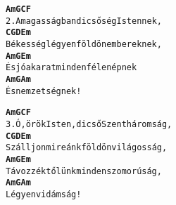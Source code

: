 \begin{minipage}{\textwidth}
\kottastart
{}
\kottaend
\begin{minipage}{\textwidth}
\begin{multicols}{2}
\begin{minipage}{\textwidth}
\begin{alltt}
\textbf{   Am             G          C  F}
2. A magasságban dicsőség Istennek,
\textbf{    C        G      D             Em}
   Békesség légyen földön embereknek,
\textbf{   Am     G     Em}
   És jóakarat mindenféle népnek
\textbf{   Am        G  Am}
   És nemzetségnek!
\end{alltt}
\vspace{0.0cm}
\versszakspacing
\end{minipage}
\begin{minipage}{\textwidth}
\begin{alltt}
\textbf{   Am             G             C  F}
3. Ó, örök Isten, dicső Szentháromság,
\textbf{     C         G     D          Em}
   Szálljon mireánk földön világosság,
\textbf{   Am        G      Em}
   Távozzék tőlünk minden szomorúság,
\textbf{    Am       G  Am}
   Légyen vidámság!
\end{alltt}
\vspace{0.0cm}
\versszakspacing
\end{minipage}
\vspace{0.2cm}
\end{multicols}
\end{minipage}

\end{minipage}
~\vspace{1.0cm}
\newline
